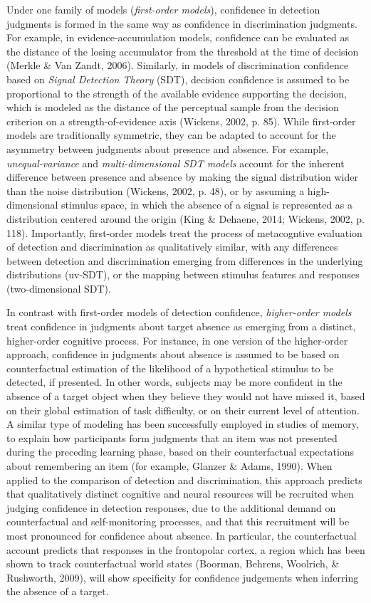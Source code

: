 \documentclass[12pt,twoside]{reedthesis}
\begin{document}
Under one family of models (\emph{first-order models}), confidence in detection judgments is formed in the same way as confidence in discrimination judgments. For example, in evidence-accumulation models, confidence can be evaluated as the distance of the losing accumulator from the threshold at the time of decision (Merkle \& Van Zandt, 2006). Similarly, in models of discrimination confidence based on \emph{Signal Detection Theory} (SDT), decision confidence is assumed to be proportional to the strength of the available evidence supporting the decision, which is modeled as the distance of the perceptual sample from the decision criterion on a strength-of-evidence axis (Wickens, 2002, p. 85). While first-order models are traditionally symmetric, they can be adapted to account for the asymmetry between judgments about presence and absence. For example, \emph{unequal-variance} and \emph{multi-dimensional SDT models} account for the inherent difference between presence and absence by making the signal distribution wider than the noise distribution (Wickens, 2002, p. 48), or by assuming a high-dimensional stimulus space, in which the absence of a signal is represented as a distribution centered around the origin (King \& Dehaene, 2014; Wickens, 2002, p. 118). Importantly, first-order models treat the process of metacogntive evaluation of detection and discrimination as qualitatively similar, with any differences between detection and discrimination emerging from differences in the underlying distributions (uv-SDT), or the mapping between stimulus features and responses (two-dimensional SDT).

In contrast with first-order models of detection confidence, \emph{higher-order models} treat confidence in judgments about target absence as emerging from a distinct, higher-order cognitive process. For instance, in one version of the higher-order approach, confidence in judgments about absence is assumed to be based on counterfactual estimation of the likelihood of a hypothetical stimulus to be detected, if presented. In other words, subjects may be more confident in the absence of a target object when they believe they would not have missed it, based on their global estimation of task difficulty, or on their current level of attention. A similar type of modeling has been successfully employed in studies of memory, to explain how participants form judgments that an item was not presented during the preceding learning phase, based on their counterfactual expectations about remembering an item (for example, Glanzer \& Adams, 1990). When applied to the comparison of detection and discrimination, this approach predicts that qualitatively distinct cognitive and neural resources will be recruited when judging confidence in detection responses, due to the additional demand on counterfactual and self-monitoring processes, and that this recruitment will be most pronounced for confidence about absence. In particular, the counterfactual account predicts that responses in the frontopolar cortex, a region which has been shown to track counterfactual world states (Boorman, Behrens, Woolrich, \& Rushworth, 2009), will show specificity for confidence judgements when inferring the absence of a target.
\end{document}
